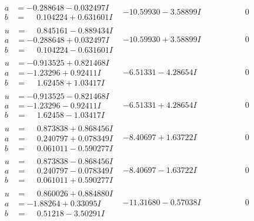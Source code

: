 \documentclass[1p]{elsarticle_modified}
\theoremstyle{definition}
\begin{document}
$$\begin{array}{c|c|c}
\begin{aligned}
a &= -0.288648 - 0.032497 I \\
b &= \phantom{-}0.104224 + 0.631601 I\end{aligned}
 & -10.59930 - 3.58899 I & \phantom{-0.000000 } 0 \\ \hline\begin{aligned}
u &= \phantom{-}0.845161 - 0.889434 I \\
a &= -0.288648 + 0.032497 I \\
b &= \phantom{-}0.104224 - 0.631601 I\end{aligned}
 & -10.59930 + 3.58899 I & \phantom{-0.000000 } 0 \\ \hline\begin{aligned}
u &= -0.913525 + 0.821468 I \\
a &= -1.23296 + 0.92411 I \\
b &= \phantom{-}1.62458 + 1.03417 I\end{aligned}
 & -6.51331 - 4.28654 I & \phantom{-0.000000 } 0 \\ \hline\begin{aligned}
u &= -0.913525 - 0.821468 I \\
a &= -1.23296 - 0.92411 I \\
b &= \phantom{-}1.62458 - 1.03417 I\end{aligned}
 & -6.51331 + 4.28654 I & \phantom{-0.000000 } 0 \\ \hline\begin{aligned}
u &= \phantom{-}0.873838 + 0.868456 I \\
a &= \phantom{-}0.240797 + 0.078349 I \\
b &= \phantom{-}0.061011 - 0.590277 I\end{aligned}
 & -8.40697 + 1.63722 I & \phantom{-0.000000 } 0 \\ \hline\begin{aligned}
u &= \phantom{-}0.873838 - 0.868456 I \\
a &= \phantom{-}0.240797 - 0.078349 I \\
b &= \phantom{-}0.061011 + 0.590277 I\end{aligned}
 & -8.40697 - 1.63722 I & \phantom{-0.000000 } 0 \\ \hline\begin{aligned}
u &= \phantom{-}0.860026 + 0.884880 I \\
a &= -1.88264 + 0.33095 I \\
b &= \phantom{-}0.51218 - 3.50291 I\end{aligned}
 & -11.31680 - 0.57038 I & \phantom{-0.000000 } 0 \\ \hline\begin{aligned}

\end{aligned}
\end{array}$$
\end{document}
